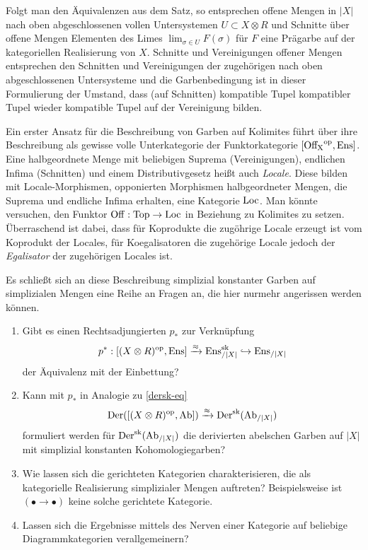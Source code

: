 \begin{bem}
  Folgt man den Äquivalenzen aus dem Satz, so entsprechen offene
  Mengen in $|X|$ nach oben abgeschlossenen vollen Untersystemen $U
  \subset X \otimes R$ und Schnitte über offene Mengen Elementen des
  Limes $\lim_{\sigma \in U} F(\sigma)$ für $F$ eine Prägarbe auf der
  kategoriellen Realisierung von $X$. Schnitte und Vereinigungen
  offener Mengen entsprechen den Schnitten und Vereinigungen der
  zugehörigen nach oben abgeschlossenen Untersysteme und die
  Garbenbedingung ist in dieser Formulierung der Umstand, dass (auf
  Schnitten) kompatible Tupel kompatibler Tupel wieder kompatible
  Tupel auf der Vereinigung bilden.
\end{bem}
\begin{bem}
  Ein erster Ansatz für die Beschreibung von Garben auf Kolimites
  führt über ihre Beschreibung als gewisse volle Unterkategorie der
  Funktorkategorie $[\operatorname{Off_X}^\mathrm{op}, \operatorname{Ens}]$. Eine halbgeordnete Menge mit
  beliebigen Suprema (Vereinigungen), endlichen Infima (Schnitten) und
  einem Distributivgesetz heißt auch \emph{Locale}. Diese bilden mit
  Locale-Morphismen, opponierten Morphismen halbgeordneter Mengen, die
  Suprema und endliche Infima erhalten, eine Kategorie $\operatorname{Loc}$. Man
  könnte versuchen, den Funktor $\operatorname{Off}: \operatorname{Top} \to \operatorname{Loc}$ in Beziehung zu
  Kolimites zu setzen. Überraschend ist dabei, dass für Koprodukte die
  zugöhrige Locale erzeugt ist vom Koprodukt der Locales, für
  Koegalisatoren die zugehörige Locale jedoch der \emph{Egalisator}
  der zugehörigen Locales ist.
\end{bem}

Es schließt sich an diese Beschreibung simplizial konstanter Garben
auf simplizialen Mengen eine Reihe an Fragen an, die hier nurmehr
angerissen werden können.
\begin{enumerate}
\item Gibt es einen Rechtsadjungierten $p_*$ zur Verknüpfung
  \[p^*: [(X \otimes R)^\mathrm{op}, \operatorname{Ens}] \xrightarrow{\approx} \operatorname{Ens}^{\operatorname{sk}}_{/|X|} \hookrightarrow \operatorname{Ens}_{/|X|} \]
  der Äquivalenz mit der Einbettung?
\item Kann mit $p_*$ in Analogie zu \ref{dersk-eq}
  \[ \operatorname{Der}([(X \otimes R)^\mathrm{op}, \operatorname{Ab}]) \xrightarrow{\approx} \operatorname{Der}^{\operatorname{sk}}(\operatorname{Ab}_{/|X|}) \]
  formuliert werden für $\operatorname{Der}^{\operatorname{sk}}(\operatorname{Ab}_{/|X|})$ die derivierten
  abelschen Garben auf $|X|$ mit simplizial konstanten
  Kohomologiegarben?
\item Wie lassen sich die gerichteten Kategorien charakterisieren, die
  als kategorielle Realisierung simplizialer Mengen auftreten?
  Beispielsweise ist $(\bullet \to \bullet)$ keine solche gerichtete
  Kategorie.
\item Lassen sich die Ergebnisse mittels des Nerven einer Kategorie
  auf beliebige Diagrammkategorien verallgemeinern?
\end{enumerate}

